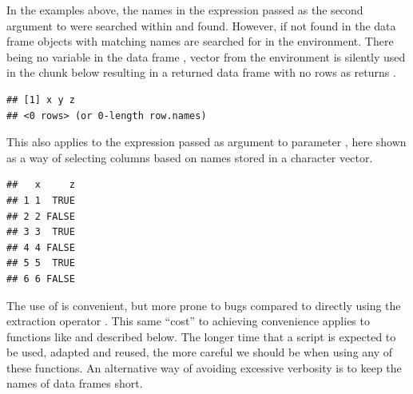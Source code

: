 \documentclass[krantz2]{krantz}\usepackage{knitr}
\begin{document}
\begin{warningbox}
In the examples above, the names in the expression passed as the second argument to  were searched within  and found. However, if not found in the data frame objects with matching names are searched for in the environment. There being no variable  in the data frame , vector  from the environment is silently used in the chunk below resulting in a returned data frame with no rows as  returns .

\begin{knitrout}\footnotesize
{}\color{fgcolor}\begin{kframe}
\begin{alltt}
 \hlkwb{<-} 
 \hlopt{>} \hlstd{)}
\end{alltt}
\begin{verbatim}
## [1] x y z
## <0 rows> (or 0-length row.names)
\end{verbatim}
\end{kframe}
\end{knitrout}

This also applies to the expression passed as argument to parameter , here shown as a way of selecting columns based on names stored in a character vector.

\begin{knitrout}\footnotesize
{}\color{fgcolor}\begin{kframe}
\begin{alltt}
 \hlkwb{<-} \hlstd{(}\hlstd{,} \hlstd{)}
  
\end{alltt}
\begin{verbatim}
##   x     z
## 1 1  TRUE
## 2 2 FALSE
## 3 3  TRUE
## 4 4 FALSE
## 5 5  TRUE
## 6 6 FALSE
\end{verbatim}
\end{kframe}
\end{knitrout}

The use of  is convenient, but more prone to bugs compared to directly using the extraction operator \code{[ ]}. This same ``cost'' to achieving convenience applies to functions like  and  described below. The longer time that a script is expected to be used, adapted and reused, the more careful we should be when using any of these functions. An alternative way of avoiding excessive verbosity is to keep the names of data frames short.
\end{warningbox}
\end{document}
